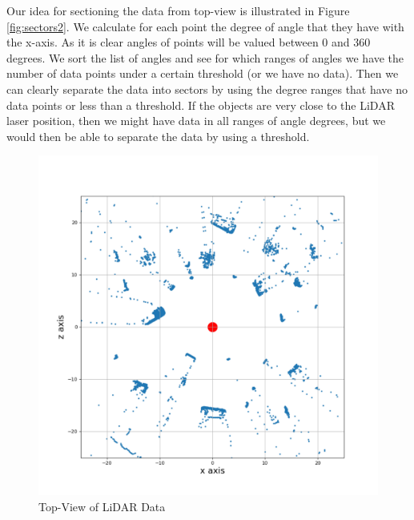 Our idea for sectioning the data from top-view is illustrated in Figure \ref{fig:sectors2}. We calculate for each point the degree of angle that they have with the x-axis. As it is clear angles of points will be valued between 0 and 360 degrees. We sort the list of angles and see for which ranges of angles we have the number of data points under a certain threshold (or we have no data). Then we can clearly separate the data into sectors by using the degree ranges that have no data points or less than a threshold. If the objects are very close to the LiDAR laser position, then we might have data in all ranges of angle degrees, but we would then be able to separate the data by using a threshold.
\begin{figure}[!h]
\centering
\begin{minipage}{0.40\textwidth}
  \centering
         \includegraphics[scale=0.3]{./images/sector-transforms/scene-with-centre.pdf}
       \caption{Top-View of LiDAR Data}
       \label{fig:sectors1}
\end{minipage}%
\begin{minipage}{0.40\textwidth}
  \centering

\end{minipage}
\end{figure}
